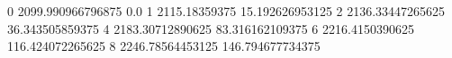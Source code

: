 0 2099.990966796875 0.0
1 2115.18359375 15.192626953125
2 2136.33447265625 36.343505859375
4 2183.30712890625 83.316162109375
6 2216.4150390625 116.424072265625
8 2246.78564453125 146.794677734375
